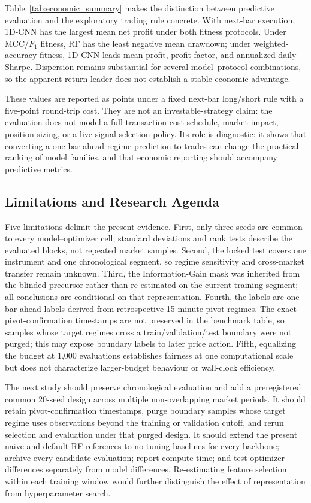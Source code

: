 Table~\ref{tab:economic_summary} makes the distinction between predictive evaluation and the exploratory trading rule concrete. With next-bar execution, 1D-CNN has the largest mean net profit under both fitness protocols. Under MCC/$F_1$ fitness, RF has the least negative mean drawdown; under weighted-accuracy fitness, 1D-CNN leads mean profit, profit factor, and annualized daily Sharpe. Dispersion remains substantial for several model--protocol combinations, so the apparent return leader does not establish a stable economic advantage.

These values are reported as points under a fixed next-bar long/short rule with a five-point round-trip cost. They are not an investable-strategy claim: the evaluation does not model a full transaction-cost schedule, market impact, position sizing, or a live signal-selection policy. Its role is diagnostic: it shows that converting a one-bar-ahead regime prediction to trades can change the practical ranking of model families, and that economic reporting should accompany predictive metrics.

\subsection{Limitations and Research Agenda}

Five limitations delimit the present evidence. First, only three seeds are common to every model--optimizer cell; standard deviations and rank tests describe the evaluated blocks, not repeated market samples. Second, the locked test covers one instrument and one chronological segment, so regime sensitivity and cross-market transfer remain unknown. Third, the Information-Gain mask was inherited from the blinded precursor rather than re-estimated on the current training segment; all conclusions are conditional on that representation. Fourth, the labels are one-bar-ahead labels derived from retrospective 15-minute pivot regimes. The exact pivot-confirmation timestamps are not preserved in the benchmark table, so samples whose target regimes cross a train/validation/test boundary were not purged; this may expose boundary labels to later price action. Fifth, equalizing the budget at 1,000 evaluations establishes fairness at one computational scale but does not characterize larger-budget behaviour or wall-clock efficiency.

The next study should preserve chronological evaluation and add a preregistered common 20-seed design across multiple non-overlapping market periods. It should retain pivot-confirmation timestamps, purge boundary samples whose target regime uses observations beyond the training or validation cutoff, and rerun selection and evaluation under that purged design. It should extend the present naive and default-RF references to no-tuning baselines for every backbone; archive every candidate evaluation; report compute time; and test optimizer differences separately from model differences. Re-estimating feature selection within each training window would further distinguish the effect of representation from hyperparameter search.
